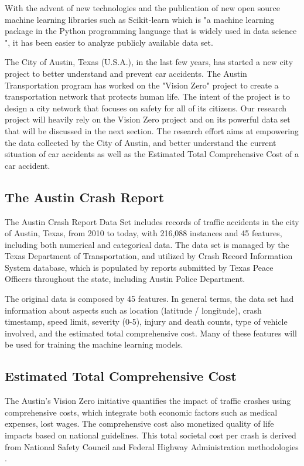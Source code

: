 \documentclass[conference]{IEEEtran}
\begin{document}
With the advent of new technologies and the publication of new open source machine learning libraries such as Scikit-learn which is "a machine learning package in the Python programming language that is widely used in data science \cite{b3}", it has been easier to analyze publicly available data set.

The City of Austin, Texas (U.S.A.), in the last few years, has started a new city project to better understand and prevent car accidents. The Austin Transportation program has worked on the "Vision Zero" project to create a transportation network that protects human life. The intent of the project is to design a city network that focuses on safety for all of its citizens\cite{b5}. Our research project will heavily rely on the Vision Zero project and on its powerful data set that will be discussed in the next section. The research effort aims at empowering the data collected by the City of Austin, and better understand the current situation of car accidents as well as the Estimated Total Comprehensive Cost of a car accident.

\subsection{The Austin Crash Report}
The Austin Crash Report Data Set\cite{b6} includes records of traffic accidents in the city of Austin, Texas, from 2010 to today, with 216,088 instances and 45 features, including both numerical and categorical data. The data set is managed by the Texas Department of Transportation, and utilized by Crash Record Information System database, which is populated by reports submitted by Texas Peace Officers throughout the state, including Austin Police Department.

The original data is composed by 45 features. In general terms, the data set had information about aspects such as location (latitude / longitude), crash timestamp, speed limit, severity (0-5), injury and death counts, type of vehicle involved, and the estimated total comprehensive cost. Many of these features will be used for training the machine learning models.

\subsection{Estimated Total Comprehensive Cost}
The Austin's Vision Zero initiative quantifies the impact of traffic crashes using comprehensive costs, which integrate both economic factors such as medical expenses, lost wages. The comprehensive cost also monetized quality of life impacts based on national guidelines. This total societal cost per crash is derived from National Safety Council and Federal Highway Administration methodologies \cite{b7}.
\end{document}

